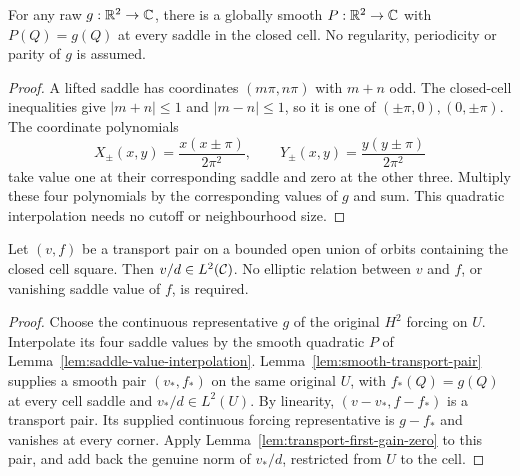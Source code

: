 \begin{lemma}
\label{lem:saddle-value-interpolation}
\leanok
For any raw $g:\mathbb{R}^2\to\mathbb{C}$, there is a globally smooth $P:\mathbb{R}^2\to\mathbb{C}$
with $P(Q)=g(Q)$ at every saddle in the closed cell.
No regularity, periodicity or parity of $g$ is assumed.
\end{lemma}

\begin{proof}
\leanok
A lifted saddle has coordinates $(m\pi,n\pi)$ with $m+n$ odd.
The closed-cell inequalities give $|m+n|\le1$ and $|m-n|\le1$, so
it is one of $(\pm\pi,0),(0,\pm\pi)$.
The coordinate polynomials
\[
 X_\pm(x,y)=\frac{x(x\pm\pi)}{2\pi^2},\qquad
 Y_\pm(x,y)=\frac{y(y\pm\pi)}{2\pi^2}
\]
take value one at their corresponding saddle and zero at the other three.
Multiply these four polynomials by the corresponding values of $g$ and sum.
This quadratic interpolation needs no cutoff or neighbourhood size.
\end{proof}

\begin{lemma}
\label{lem:transport-first-gain}
\leanok
Let $(v,f)$ be a transport pair on a bounded open union of orbits containing
the closed cell square. Then $v/d\in L^2(\mathcal{C})$. No elliptic relation
between $v$ and $f$, or vanishing saddle value of $f$, is required.
\end{lemma}

\begin{proof}
\leanok
Choose the continuous representative $g$ of the original $H^2$ forcing
on $U$. Interpolate its four saddle values by the smooth quadratic $P$
of Lemma~\ref{lem:saddle-value-interpolation}.
Lemma~\ref{lem:smooth-transport-pair} supplies a smooth pair $(v_*,f_*)$
on the same original $U$, with $f_*(Q)=g(Q)$ at every cell saddle and
$v_*/d\in L^2(U)$.
By linearity, $(v-v_*,f-f_*)$ is a transport pair. Its supplied continuous
forcing representative is $g-f_*$ and vanishes at every corner.
Apply Lemma~\ref{lem:transport-first-gain-zero} to this pair, and add
back the genuine norm of $v_*/d$, restricted from $U$ to the cell.
\end{proof}

